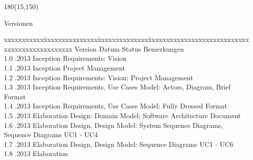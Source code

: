 
\begin{textblock}{180}(15,150)
\color{black}
\begin{huge}
Versionen
\end{huge}
\vspace{10mm}

\fontsize{10pt}{18pt}\selectfont
\begin{tabbing}
xxxxxxxxxxx\=xxxxxxxxxxxxxxx\=xxxxxxxxxxxxxx\=xxxxxxxxxxxxxxxxxxxxxxxxxxxxxxxxxxxxxxxxxxxxxxx \kill
Version	\> Datum	\> Status		\> Bemerkungen \\
1.0	.2013	\> Inception		\> Requirements: Vision \\
1.1	.2013	\> Inception		\> Project Management \\
1.2	.2013	\> Inception		\> Requirements: Vision; Project Management \\
1.3	.2013	\> Inception		\> Requirements, Use Cases Model: Actors, Diagram, Brief Format \\
1.4	.2013	\> Inception		\> Requirements, Use Cases Model: Fully Dressed Format \\
1.5	.2013	\> Elaboration		\> Design: Domain Model; Software Architecture Document \\
1.6	.2013	\> Elaboration		\> Design, Design Model: System Sequence Diagrams, Sequence Diagrams UC1 - UC4 \\
1.7	.2013	\> Elaboration		\> Design, Design Model: Sequence Diagrams UC1 - UC6 \\
1.8	.2013	\> Elaboration		\>  \\
\end{tabbing}

\end{textblock}
